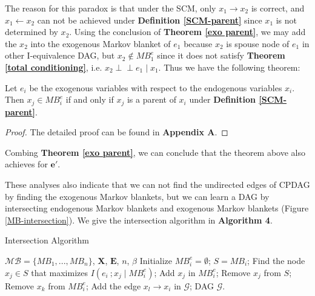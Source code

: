 \documentclass[twoside,11pt]{article}
\begin{document}
The reason for this paradox is that under the SCM, only $x_1\to x_2$ is correct, and $x_1\gets x_2$ can not be achieved under \textbf{Definition \ref{SCM-parent}} since $x_1$ is not determined by $x_2$. Using the conclusion of \textbf{Theorem \ref{exo parent}}, we may add the $x_2$ into the exogenous Markov blanket of $e_1$ because $x_2$ is spouse node of $e_1$ in other I-equivalence DAG, but $x_2\notin MB^e_1$ since it does not satisfy \textbf{Theorem \ref{total conditioning}}, i.e. $x_2\perp\!\!\!\perp e_1\mid x_1$. Thus we have the following theorem:
\begin{theorem}
\label{exo MB}
Let $e_i$ be the exogenous variables with respect to the endogenous variables $x_i$. Then $x_j\in MB^e_i$ if and only if $x_j$ is a parent of $x_i$ under \textbf{Definition \ref{SCM-parent}}.
\end{theorem}
\begin{proof}
    The detailed proof can be found in \textbf{Appendix A}.
\end{proof}
Combing \textbf{Theorem \ref{exo parent}}, we can conclude that the theorem above also achieves for $\mathbf e'$.



These analyses also indicate that we can not find the undirected edges of CPDAG by finding the exogenous Markov blankets, but we can learn a DAG by intersecting endogenous Markov blankets and exogenous Markov blankets (Figure \ref{MB-intersection}). We give the intersection algorithm in \textbf{Algorithm 4}.

\begin{algorithm}
\renewcommand{\algorithmicrequire}{\textbf{Input:}}
\renewcommand{\algorithmicensure}{\textbf{Output:}}
\caption{Intersection Algorithm}
\label{Intersection}
\begin{algorithmic}[1]
\REQUIRE $\mathcal{MB}=\{MB_1, ..., MB_n\}$, $\mathbf X$, $\mathbf E$, $n$, $\beta$
\STATE Initialize $MB^e_i=\emptyset$;
\STATE $S=MB_i$;
\STATE Find the node $x_j\in S$ that maximizes $I(e_i\ ; x_j\mid MB^e_i)$;
\STATE Add $x_j$ in $MB^e_i$;
\STATE Remove $x_j$ from $S$;
\ENDIF
\ENDWHILE
{}
\STATE Remove $x_k$ from $MB^e_i$;
\ENDIF
\ENDFOR
{}
\STATE Add the edge $x_l \to x_i$ in $\mathcal G$;
\ENDFOR
\ENDFOR
\ENSURE DAG $\mathcal G$.
\end{algorithmic}
\end{algorithm}
\end{document}
